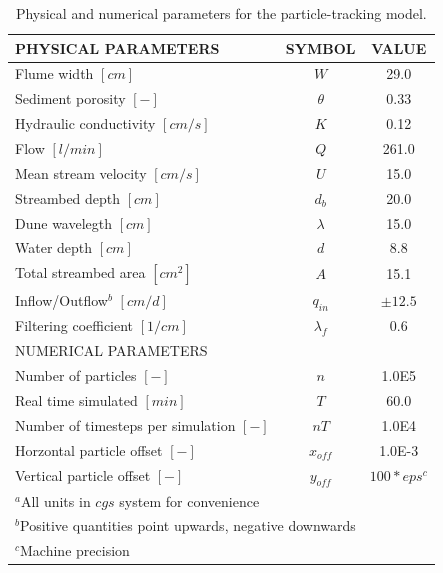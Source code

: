 \documentclass[draft,linenumbers]{agujournal2018}
\begin{document}
\begin{table}
\caption{Physical \citep{Fox2018} and numerical parameters \citep{Packman2000}
for the particle-tracking model. }
\label{TF:Phys_Param}
\centering
\begin{tabular}{l c c}
\hline
PHYSICAL PARAMETERS						& SYMBOL			& VALUE			\\
\hline
  Flume width $[cm]$  					& $W$				& 29.0 			\\
  Sediment porosity $[-]$				& $\theta$			& 0.33 			\\
  Hydraulic conductivity $[cm/s]$ 		& $K$				& 0.12 			\\
  Flow $[l/min]$						& $Q$				& 261.0			\\
  Mean stream velocity $[cm/s]$			& $U$				& 15.0 			\\
  Streambed depth $[cm]$				& $d_b$				& 20.0 			\\
  Dune wavelegth $[cm]$					& $\lambda$			& 15.0 			\\
  Water depth $[cm]$					& $d$				& 8.8 			\\
  Total streambed area $[cm^{2}]$		& $A$				& 15.1	 		\\
  Inflow/Outflow$^{b}$ $[cm/d]$			& $q_{in}$			& $\pm 12.5$	\\
  Filtering coefficient $[1/cm]$		& $\lambda_f$		& 0.6			\\
\hline
NUMERICAL PARAMETERS					& 					& 				\\
\hline
  Number of particles $[-]$				& $n$				& 1.0E5			\\
  Real time simulated $[min]$			& $T$				& 60.0 			\\
  Number of timesteps per simulation $[-]$ &$nT$			& 1.0E4			\\
  Horzontal particle offset $[-]$		& $x_{off}$			& 1.0E-3		\\
  Vertical particle offset $[-]$		& $y_{off}$			& $100*eps^{c}$ \\
\hline
\multicolumn{2}{l}{$^{a}$All units in $cgs$ system for convenience} \\
\multicolumn{2}{l}{$^{b}$Positive quantities point upwards, negative 
downwards} \\
\multicolumn{2}{l}{$^{c}$Machine precision}
\end{tabular}
\end{table}
\end{document}
